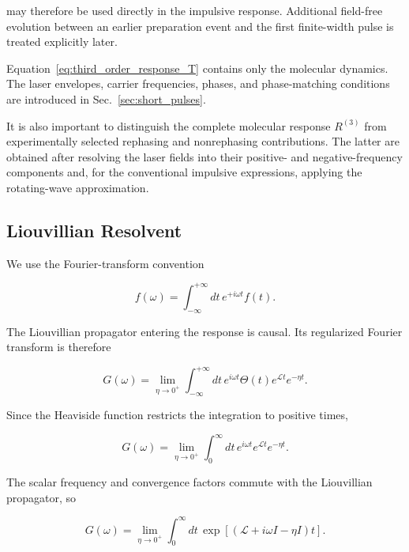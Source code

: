 \documentclass[11pt]{article}
\begin{document}
may therefore be used directly in the impulsive response. Additional
field-free evolution between an earlier preparation event and the first
finite-width pulse is treated explicitly later.

Equation~\eqref{eq:third_order_response_T} contains only the molecular
dynamics. The laser envelopes, carrier frequencies, phases, and
phase-matching conditions are introduced in
Sec.~\ref{sec:short_pulses}.

It is also important to distinguish the complete molecular response
$R^{(3)}$ from experimentally selected rephasing and nonrephasing
contributions. The latter are obtained after resolving the laser fields
into their positive- and negative-frequency components and, for the
conventional impulsive expressions, applying the rotating-wave
approximation.


\subsection{Liouvillian Resolvent}

We use the Fourier-transform convention

\begin{equation}
f(\omega)
=
\int_{-\infty}^{+\infty}
dt\,
e^{+i\omega t}
f(t).
\label{eq:fourier_convention}
\end{equation}

The Liouvillian propagator entering the response is causal. Its
regularized Fourier transform is therefore

\begin{equation}
G(\omega)
=
\lim_{\eta\rightarrow0^+}
\int_{-\infty}^{+\infty}
dt\,
e^{i\omega t}
\Theta(t)
e^{\mathcal{L}t}
e^{-\eta t}.
\label{eq:causal_resolvent_integral}
\end{equation}

Since the Heaviside function restricts the integration to positive
times,

\begin{equation}
G(\omega)
=
\lim_{\eta\rightarrow0^+}
\int_0^\infty
dt\,
e^{i\omega t}
e^{\mathcal{L}t}
e^{-\eta t}.
\end{equation}

The scalar frequency and convergence factors commute with the
Liouvillian propagator, so

\begin{equation}
G(\omega)
=
\lim_{\eta\rightarrow0^+}
\int_0^\infty
dt\,
\exp
\left[
\left(
\mathcal{L}
+
i\omega I
-
\eta I
\right)t
\right].
\label{eq:resolvent_exponential_integral}
\end{equation}
\end{document}
